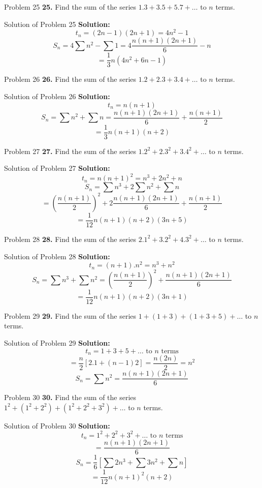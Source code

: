 \documentclass[aspectratio=1610,8pt]{beamer}
\begin{document}
\begin{frame}{Problem 25}
  \textbf{25.} Find the sum of the series $1.3 + 3.5 + 5.7 + \ldots$ to $n$ terms.
\end{frame}
\begin{frame}{Solution of Problem 25}
  \textbf{Solution:} $$t_n = (2n - 1)(2n + 1) = 4n^2 - 1$$
  $$S_n = 4\sum n^2 - \sum 1 = 4\frac{n(n + 1)(2n + 1)}{6} - n$$
  $$= \frac{1}{3}n(4n^2 + 6n - 1)$$
\end{frame}
\begin{frame}{Problem 26}
  \textbf{26.} Find the sum of the series $1.2 + 2.3 + 3.4 + \ldots$ to $n$ terms.
\end{frame}
\begin{frame}{Solution of Problem 26}
  \textbf{Solution:} $$t_n = n(n + 1)$$
  $$S_n = \sum n^2 + \sum n = \frac{n(n + 1)(2n + 1)}{6} + \frac{n(n + 1)}{2}$$
  $$= \frac{1}{3}n(n + 1)(n + 2)$$
\end{frame}
\begin{frame}{Problem 27}
  \textbf{27.} Find the sum of the series $1.2^2 + 2.3^2 + 3.4^2 + \ldots$ to $n$ terms.
\end{frame}
\begin{frame}{Solution of Problem 27}
  \textbf{Solution:} $$t_n = n(n + 1)^2 = n^3 + 2n^2 + n$$
  $$S_n = \sum n^3 + 2\sum n^2 + \sum n$$
  $$= \left(\frac{n(n + 1)}{2}\right)^2 + 2\frac{n(n + 1)(2n + 1)}{6} + \frac{n(n + 1)}{2}$$
  $$= \frac{1}{12}n(n + 1)(n + 2)(3n + 5)$$
\end{frame}
\begin{frame}{Problem 28}
  \textbf{28.} Find the sum of the series $2.1^2 + 3.2^2 + 4.3^2 + \ldots$ to $n$ terms.
\end{frame}
\begin{frame}{Solution of Problem 28}
  \textbf{Solution:} $$t_n = (n + 1).n^2 = n^3 + n^2$$
  $$S_n = \sum n^3 + \sum n^2 = \left(\frac{n(n + 1)}{2}\right)^2 + \frac{n(n +1)(2n + 1)}{6}$$
  $$= \frac{1}{12}n(n + 1)(n + 2)(3n + 1)$$
\end{frame}
\begin{frame}{Problem 29}
  \textbf{29.} Find the sum of the series $1 + (1 + 3) + (1 + 3 + 5) + \ldots$ to $n$ terms.
\end{frame}
\begin{frame}{Solution of Problem 29}
  \textbf{Solution:} $$t_n = 1 + 3 + 5 + \ldots \text{~to~}n\text{~terms}$$
  $$= \frac{n}{2}[2.1 + (n - 1)2] = \frac{n(2n)}{2} = n^2$$
  $$S_n = \sum n^2 = \frac{n(n + 1)(2n + 1)}{6}$$
\end{frame}
\begin{frame}{Problem 30}
  \textbf{30.} Find the sum of the series $1^2 + (1^2 + 2^2) + (1^2 + 2^2 + 3^2) + \ldots$ to $n$ terms.
\end{frame}
\begin{frame}{Solution of Problem 30}
  \textbf{Solution:} $$t_n = 1^2 + 2^2 + 3^2 + \ldots\text{~to~}n\text{~terms}$$
  $$= \frac{n(n + 1)(2n + 1)}{6}$$
  $$S_n = \frac{1}{6}[\sum 2n^3 + \sum 3n^2 +\sum n]$$
  $$= \frac{1}{12}n(n + 1)^2(n + 2)$$
\end{frame}
\end{document}
